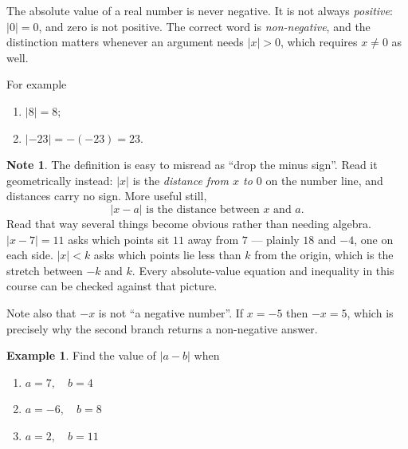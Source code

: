 \documentclass[11pt,a4paper]{article}
\theoremstyle{definition}
\newtheorem{example}[thm]{Example}
\newtheorem{note}[thm]{Note}
\begin{document}
\begin{enumerate}
The absolute value of a real number is never negative. It is not always
\emph{positive}: $\left|0\right|=0$, and zero is not positive. The correct word is
\emph{non-negative}, and the distinction matters whenever an argument needs
$\left|x\right|>0$, which requires $x\neq 0$ as well.

For example
\begin{enumerate}
\item[(a).] $\left|8\right|=8$;
\item[(b).] $\left|-23\right|=-(-23)=23$.
\end{enumerate}

\begin{note}
The definition is easy to misread as ``drop the minus sign''. Read it geometrically
instead: $\left|x\right|$ is the \emph{distance from $x$ to $0$} on the number
line, and distances carry no sign. More useful still,
$$\left|x-a\right| \text{ is the distance between } x \text{ and } a .$$
Read that way several things become obvious rather than needing algebra.
$\left|x-7\right|=11$ asks which points sit $11$ away from $7$ --- plainly $18$ and
$-4$, one on each side. $\left|x\right|<k$ asks which points lie less than $k$ from
the origin, which is the stretch between $-k$ and $k$. Every absolute-value
equation and inequality in this course can be checked against that picture.

Note also that $-x$ is not ``a negative number''. If $x=-5$ then $-x=5$, which is
precisely why the second branch returns a non-negative answer.
\end{note}
\end{enumerate}


\begin{example}

Find the value of $|a-b|$ when
\begin{enumerate}
\item[(i).] $a=7,\quad  b=4$
\item[(ii).] $a=-6,\quad  b=8$
\item[(iii).] $a=2,\quad  b=11$
\end{enumerate}
\end{example}
\end{document}
